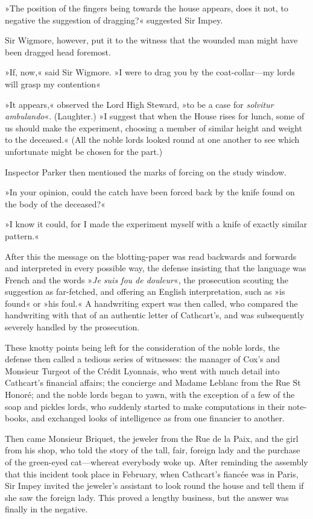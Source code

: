 »The position of the fingers being towards the house appears, does it not, to negative the suggestion of dragging?« suggested Sir Impey.

Sir Wigmore, however, put it to the witness that the wounded man might have been dragged head foremost.

»If, now,« said Sir Wigmore. »I were to drag you by the coat-collar\allowbreak---\allowbreak my lords will grasp my contention\longdash«

»It appears,« observed the Lord High Steward, »to be a case for \textit{solvitur ambulando}«. (Laughter.) »I suggest that when the House rises for lunch, some of us should make the experiment, choosing a member of similar height and weight to the deceased.« (All the noble lords looked round at one another to see which unfortunate might be chosen for the part.)

Inspector Parker then mentioned the marks of forcing on the study window.

»In your opinion, could the catch have been forced back by the knife found on the body of the deceased?«

»I know it could, for I made the experiment myself with a knife of exactly similar pattern.«

After this the message on the blotting-paper was read backwards and forwards and interpreted in every possible way, the defense insisting that the language was French and the words »\textit{Je suis fou de douleur}«, the prosecution scouting the suggestion as far-fetched, and offering an English interpretation, such as »is found« or »his foul.« A handwriting expert was then called, who compared the handwriting with that of an authentic letter of Cathcart's, and was subsequently severely handled by the prosecution.

These knotty points being left for the consideration of the noble lords, the defense then called a tedious series of witnesses: the manager of Cox's and Monsieur Turgeot of the Crédit Lyonnais, who went with much detail into Cathcart's financial affairs; the concierge and Madame Leblanc from the Rue St Honoré; and the noble lords began to yawn, with the exception of a few of the soap and pickles lords, who suddenly started to make computations in their note-books, and exchanged looks of intelligence as from one financier to another.

Then came Monsieur Briquet, the jeweler from the Rue de la Paix, and the girl from his shop, who told the story of the tall, fair, foreign lady and the purchase of the green-eyed cat\allowbreak---\allowbreak whereat everybody woke up.  After reminding the assembly that this incident took place in February, when Cathcart's fiancée was in Paris, Sir Impey invited the jeweler's assistant to look round the house and tell them if she saw the foreign lady. This proved a lengthy business, but the answer was finally in the negative.

